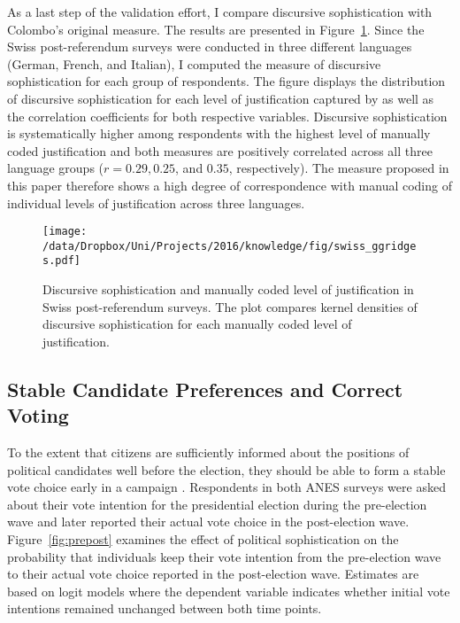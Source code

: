 As a last step of the validation effort, I compare discursive sophistication with Colombo's \citeyearpar{colombo2016justifications} original measure. The results are presented in Figure~\ref{fig:swiss_ggridges}. Since the Swiss post-referendum surveys were conducted in three different languages (German, French, and Italian), I computed the measure of discursive sophistication for each group of respondents. The figure displays the distribution of discursive sophistication for each level of justification captured by \citet{colombo2016justifications} as well as the correlation coefficients for both respective variables. Discursive sophistication is systematically higher among respondents with the highest level of manually coded justification and both measures are positively correlated across all three language groups ($r=0.29, 0.25$, and $0.35$, respectively). The measure proposed in this paper therefore shows a high degree of correspondence with manual coding of individual levels of justification across three languages.

\begin{figure}[h]\centering
\texttt{[image: /data/Dropbox/Uni/Projects/2016/knowledge/fig/swiss\_ggridges.pdf]}
\caption{Discursive sophistication and manually coded level of justification \citep{colombo2016justifications} in Swiss post-referendum surveys. The plot compares kernel densities of discursive sophistication for each manually coded level of justification.}\label{fig:swiss_ggridges}
\end{figure}


\subsection{Stable Candidate Preferences and Correct Voting}
To the extent that citizens are sufficiently informed about the positions of political candidates well before the election, they should be able to form a stable vote choice early in a campaign \citep[e.g.,][]{gelman1993american,nir2008campaign}. Respondents in both ANES surveys were asked about their vote intention for the presidential election during the pre-election wave and later reported their actual vote choice in the post-election wave. Figure~\ref{fig:prepost} examines the effect of political sophistication on the probability that individuals keep their vote intention from the pre-election wave to their actual vote choice reported in the post-election wave. Estimates are based on logit models where the dependent variable indicates whether initial vote intentions remained unchanged between both time points.

